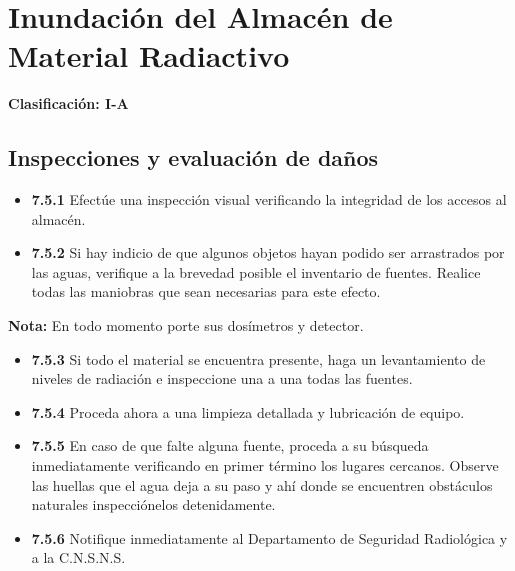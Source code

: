 \section{Inundación del Almacén de Material Radiactivo}
\textbf{Clasificación: I-A}

\subsection{Inspecciones y evaluación de daños}
\begin{itemize}
  \item \textbf{7.5.1} Efectúe una inspección visual verificando la integridad de los accesos al almacén.
  \item \textbf{7.5.2} Si hay indicio de que algunos objetos hayan podido ser arrastrados por las aguas, verifique a la brevedad posible el inventario de fuentes. Realice todas las maniobras que sean necesarias para este efecto.
\end{itemize}

\textbf{Nota:} En todo momento porte sus dosímetros y detector.

\begin{itemize}
  \item \textbf{7.5.3} Si todo el material se encuentra presente, haga un levantamiento de niveles de radiación e inspeccione una a una todas las fuentes.
  \item \textbf{7.5.4} Proceda ahora a una limpieza detallada y lubricación de equipo.
  \item \textbf{7.5.5} En caso de que falte alguna fuente, proceda a su búsqueda inmediatamente verificando en primer término los lugares cercanos. Observe las huellas que el agua deja a su paso y ahí donde se encuentren obstáculos naturales inspecciónelos detenidamente.
  \item \textbf{7.5.6} Notifique inmediatamente al Departamento de Seguridad Radiológica y a la C.N.S.N.S.
\end{itemize}